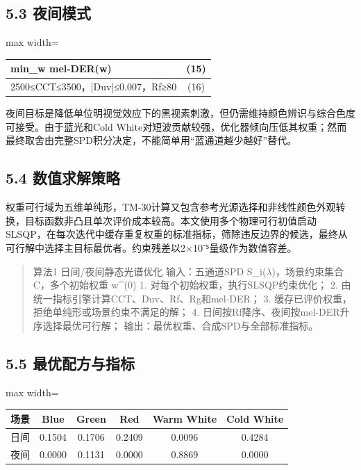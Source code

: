 \documentclass[UTF8,a4paper,12pt]{ctexart}
\begin{document}
\subsection{5.3 夜间模式}

\begin{table}[H]
\centering
\small
\begin{adjustbox}{max width=\textwidth}
\begin{tabular}{lc}
\toprule
min\_w mel-DER(w) & (15) \\
\midrule
2500≤CCT≤3500，|Duv|≤0.007，Rf≥80 & (16) \\
\bottomrule
\end{tabular}
\end{adjustbox}
\end{table}

夜间目标是降低单位明视觉效应下的黑视素刺激，但仍需维持颜色辨识与综合色度可接受。由于蓝光和Cold White对短波贡献较强，优化器倾向压低其权重；然而最终取舍由完整SPD积分决定，不能简单用“蓝通道越少越好”替代。

\subsection{5.4 数值求解策略}

权重可行域为五维单纯形，TM-30计算又包含参考光源选择和非线性颜色外观转换，目标函数非凸且单次评价成本较高。本文使用多个物理可行初值启动SLSQP，在每次迭代中缓存重复权重的标准指标，筛除违反边界的候选，最终从可行解中选择主目标最优者。约束残差以2×10⁻⁵量级作为数值容差。

\begin{quote}\small
算法1  日间/夜间静态光谱优化 输入：五通道SPD S\_i($\lambda$)，场景约束集合 C，多个初始权重 w\textasciicircum{}(0) 1. 对每个初始权重，执行SLSQP约束优化； 2. 由统一指标引擎计算CCT、Duv、Rf、Rg和mel-DER； 3. 缓存已评价权重，拒绝单纯形或场景约束不满足的解； 4. 日间按Rf降序、夜间按mel-DER升序选择最优可行解； 输出：最优权重、合成SPD与全部标准指标。
\end{quote}

\subsection{5.5 最优配方与指标}

\begin{table}[H]
\centering
\small
\begin{adjustbox}{max width=\textwidth}
\begin{tabular}{lccccc}
\toprule
场景 & Blue & Green & Red & Warm White & Cold White \\
\midrule
日间 & 0.1504 & 0.1706 & 0.2409 & 0.0096 & 0.4284 \\
夜间 & 0.0000 & 0.1131 & 0.0000 & 0.8869 & 0.0000 \\
\bottomrule
\end{tabular}
\end{adjustbox}
\end{table}
\end{document}
